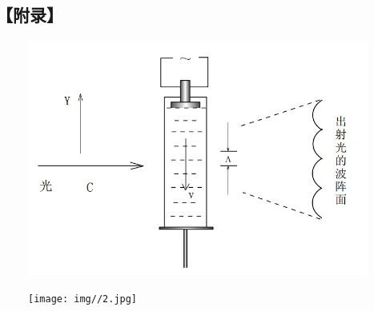 \documentclass[12pt,a4paper,UTF8]{ctexart}
\begin{document}
\newpage
\subsection*{【附录】}
\begin{figure}[htbp]
	\centering
	\includegraphics[width=\textwidth]{img//1.jpg}
	\label{fig:3}
\end{figure}
\begin{figure}[htbp]
	\centering
	\texttt{[image: img//2.jpg]}
	\label{fig:4}
\end{figure}
\end{document}
